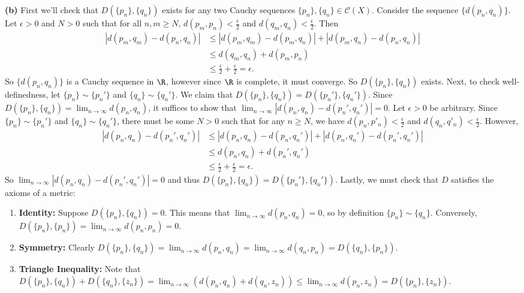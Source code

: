 \documentclass[11pt,letterpaper]{article}
\begin{document}
\begin{solution}
    \textbf{(b)} First we'll check that $D(\{p_n\}, \{q_n\})$ exists for any two Cauchy sequences $\{p_n\}, \{q_n\}\in \mathcal{C}(X)$. Consider the sequence $\{d(p_n, q_n)\}$. Let $\epsilon>0$ and $N>0$ such that for all $n,m\geq N$, $d(p_m, p_n)<\frac{\epsilon}{2}$ and $d(q_m,q_n)<\frac{\epsilon}{2}$. Then
    \[
        \begin{aligned}
            |d(p_m,q_m)-d(p_n,q_n)| &\leq |d(p_m,q_m)-d(p_m, q_n)|+|d(p_m, q_n)-d(p_n,q_n)|\\
            &\leq d(q_m, q_n)+d(p_m,p_n)\\
            &\leq \frac{\epsilon}{2}+\frac{\epsilon}{2}=\epsilon.
        \end{aligned}
    \]  
    So $\{d(p_n,q_n)\}$ is a Cauchy sequence in $\R$, however since $\R$ is complete, it must converge. So $D(\{p_n\}, \{q_n\})$ exists. Next, to check well-definedness, let $\{p_n\}\sim \{p_n'\}$ and $\{q_n\}\sim \{q_n'\}$. We claim that $D(\{p_n\},\{q_n\})=D(\{p_n'\}, \{q_n'\})$. Since $D(\{p_n\}, \{q_n\})=\lim_{n\to \infty}d(p_n,q_n)$, it suffices to show that $\lim_{n\to\infty}|d(p_n,q_n)-d(p_n', q_n')|=0$. Let $\epsilon > 0$ be arbitrary. Since $\{p_n\}\sim \{p_n'\}$ and $\{q_n\}\sim \{q_n'\}$, there must be some $N>0$ such that for any $n\geq N$, we have $d(p_n, p'_n)<\frac{\epsilon}{2}$ and $d(q_n,q'_n)<\frac{\epsilon}{2}$. However,
    \[
        \begin{aligned}
            |d(p_n,q_n)-d(p_n',q_n')|&\leq |d(p_n,q_n)-d(p_n,q_n')|+|d(p_n,q_n')-d(p_n',q_n')|\\
            &\leq d(p_n,q_n)+d(p_n',q_n')\\
            &\leq \frac{\epsilon}{2}+\frac{\epsilon}{2}=\epsilon.
        \end{aligned}
    \]
    So $\lim_{n\to\infty}|d(p_n,q_n)-d(p_n',q_n')|=0$ and thus $D(\{p_n\}, \{q_n\})=D(\{p_n'\}, \{q_n'\})$. Lastly, we must check that $D$ satisfies the axioms of a metric:
    \begin{enumerate}
        \item \textbf{Identity:} Suppose $D(\{p_n\}, \{q_n\})=0$. This means that $\lim_{n\to \infty}d(p_n,q_n)=0$, so by definition $\{p_n\}\sim \{q_n\}$. Conversely, $D(\{p_n\},\{p_n\})=\lim_{n\to\infty}d(p_n,p_n)=0$.
        \item \textbf{Symmetry:} Clearly $D(\{p_n\},\{q_n\})=\lim_{n\to\infty}d(p_n,q_n)=\lim_{n\to\infty}d(q_n,p_n)=D(\{q_n\}, \{p_n\})$.
        \item \textbf{Triangle Inequality:} Note that $D(\{p_n\},\{q_n\})+D(\{q_n\},\{z_n\})=\lim_{n\to \infty}(d(p_n,q_n)+d(q_n,z_n))\leq \lim_{n\to\infty}d(p_n,z_n)=D(\{p_n\}, \{z_n\})$.
    \end{enumerate} 
    

\end{solution}
\end{document}

